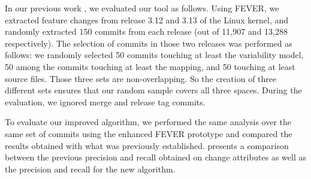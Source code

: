 In our previous work \citep{dintzner_fever:_2016}, we evaluated our tool as follows.
Using FEVER, we extracted feature changes from release 3.12 and 3.13 of the Linux kernel, and randomly extracted 150 commits from each release (out of 11,907 and 13,288 respectively).
The selection of commits in those two releases was performed as follows:
we randomly selected 50 commits touching at least the variability model, 50 among the commits touching  at least the mapping,
and 50 touching at least source files.
Those three sets are non-overlapping.
So the creation of three different sets ensures that our random sample covers all three spaces.
During the evaluation, we ignored merge and release tag commits.

To evaluate our improved algorithm, we performed the same analysis over the same set of commits using the enhanced FEVER prototype and compared the
results obtained with what was previously established. 
 presents a comparison between the previous 
precision and recall obtained on change attributes as well as the precision and recall for the new algorithm.


